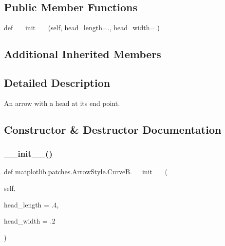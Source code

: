 \subsection*{Public Member Functions}
\begin{DoxyCompactItemize}
\item 
def \hyperlink{classmatplotlib_1_1patches_1_1ArrowStyle_1_1CurveB_afebb2b96cfccebb69a562de7cf5253fe}{\+\_\+\+\_\+init\+\_\+\+\_\+} (self, head\+\_\+length=., \hyperlink{classmatplotlib_1_1patches_1_1ArrowStyle_1_1__Curve_a360e40f4780784399d97fd36b8569ab7}{head\+\_\+width}=.)
\end{DoxyCompactItemize}
\subsection*{Additional Inherited Members}


\subsection{Detailed Description}
\begin{DoxyVerb}An arrow with a head at its end point.\end{DoxyVerb}
 

\subsection{Constructor \& Destructor Documentation}
\mbox{\label{classmatplotlib_1_1patches_1_1ArrowStyle_1_1CurveB_afebb2b96cfccebb69a562de7cf5253fe}} 
\subsubsection{\texorpdfstring{\+\_\+\+\_\+init\+\_\+\+\_\+()}{\_\_init\_\_()}}
{\footnotesize\ttfamily def matplotlib.\+patches.\+Arrow\+Style.\+Curve\+B.\+\_\+\+\_\+init\+\_\+\+\_\+ (\begin{DoxyParamCaption}\item[{}]{self,  }\item[{}]{head\+\_\+length = {\ttfamily .4},  }\item[{}]{head\+\_\+width = {\ttfamily .2} }\end{DoxyParamCaption})}

